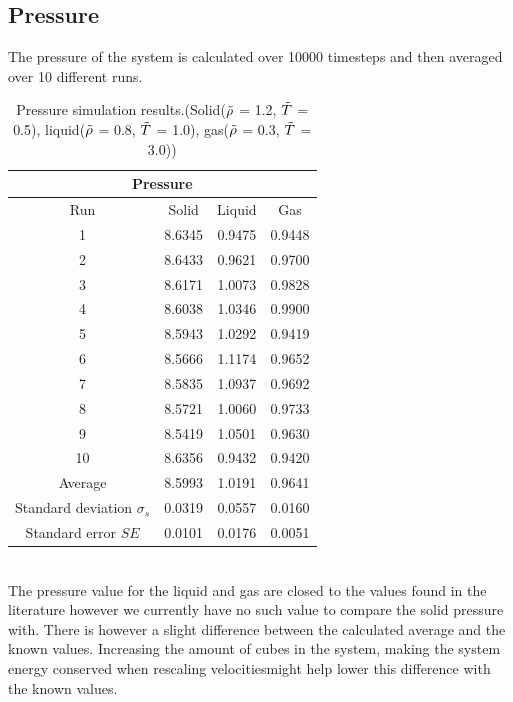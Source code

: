 \documentclass[a4paper,12pt]{article} %
\begin{document}
\subsection{Pressure}
The pressure of the system is calculated over 10000 timesteps and then averaged over 10 different runs.
\begin{table}[!htbp]
    \centering
    \begin{tabular}{c|c|c|c}
    \hline
    \multicolumn{4}{c}{Pressure}\\
    \hline
    Run & Solid & Liquid & Gas\\
    \hline
    1 & 8.6345 & 0.9475 & 0.9448\\
    \hline
    2 & 8.6433 & 0.9621 & 0.9700\\
    \hline
    3 & 8.6171 & 1.0073 & 0.9828\\
    \hline
    4 & 8.6038 & 1.0346 & 0.9900\\
    \hline
    5 & 8.5943 & 1.0292 & 0.9419\\
    \hline
    6 & 8.5666 & 1.1174 & 0.9652\\
    \hline
    7 & 8.5835 & 1.0937 & 0.9692\\
    \hline
    8 & 8.5721 & 1.0060 & 0.9733\\
    \hline
    9 & 8.5419 & 1.0501 & 0.9630\\
    \hline
    10 & 8.6356 & 0.9432 & 0.9420\\
    \hline
    Average & 8.5993 & 1.0191 & 0.9641\\
    \hline
    Standard deviation $\sigma_s$ & 0.0319 & 0.0557 & 0.0160\\
    \hline
    Standard error $SE$ & 0.0101 & 0.0176 & 0.0051\\
    \hline
    \end{tabular}
    \caption{Pressure simulation results.(Solid($\Tilde{\rho}$ = 1.2, $\Tilde{T}$ = 0.5), liquid($\Tilde{\rho}$ = 0.8, $\Tilde{T}$ = 1.0), gas($\Tilde{\rho}$ = 0.3, $\Tilde{T}$ = 3.0))}
    \label{tab:my_label}
\end{table}\\
The pressure value for the liquid and gas are closed to the values found in the literature \cite{Johnson} however we currently have no such value to compare the solid pressure with. There is however a slight difference between the calculated average and the known values. Increasing the amount of cubes in the system, making the system energy conserved when rescaling velocitiesmight help lower this difference with the known values.
\end{document}
